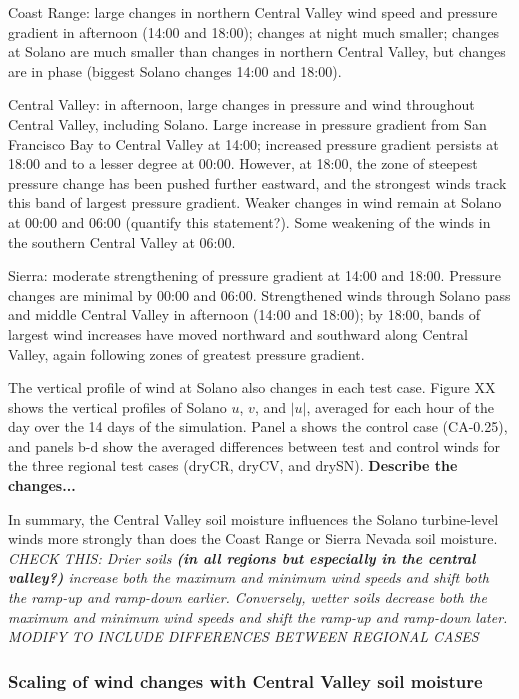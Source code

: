 Coast Range: large changes in northern Central Valley wind speed and pressure gradient in afternoon (14:00 and 18:00); changes at night much smaller; changes at Solano are much smaller than changes in northern Central Valley, but changes are in phase (biggest Solano changes 14:00 and 18:00).

Central Valley: in afternoon, large changes in pressure and wind throughout Central Valley, including Solano.  Large increase in pressure gradient from San Francisco Bay to Central Valley at 14:00; increased pressure gradient persists at 18:00 and to a lesser degree at 00:00.  However, at 18:00, the zone of steepest pressure change has been pushed further eastward, and the strongest winds track this band of largest pressure gradient.  Weaker changes in wind remain at Solano at 00:00 and 06:00 (quantify this statement?).  Some weakening of the winds in the southern Central Valley at 06:00.

Sierra: moderate strengthening of pressure gradient at 14:00 and 18:00.  Pressure changes are minimal by 00:00 and 06:00.  Strengthened winds through Solano pass and middle Central Valley in afternoon (14:00 and 18:00); by 18:00, bands of largest wind increases have moved northward and southward along Central Valley, again following zones of greatest pressure gradient.

The vertical profile of wind at Solano also changes in each test case.  Figure XX shows the vertical profiles of Solano $u$, $v$, and $|u|$, averaged for each hour of the day over the 14 days of the simulation.  Panel a shows the control case (CA-0.25), and panels b-d show the averaged differences between test and control winds for the three regional test cases (dryCR, dryCV, and drySN).  \textbf{Describe the changes...}

In summary, the Central Valley soil moisture influences the Solano turbine-level winds more strongly than does the Coast Range or Sierra Nevada soil moisture.  \textit{CHECK THIS: Drier soils \textbf{(in all regions but especially in the central valley?)} increase both the maximum and minimum wind speeds and shift both the ramp-up and ramp-down earlier.  Conversely, wetter soils decrease both the maximum and minimum wind speeds and shift the ramp-up and ramp-down later.  MODIFY TO INCLUDE DIFFERENCES BETWEEN REGIONAL CASES}

\subsubsection{Scaling of wind changes with Central Valley soil moisture}

